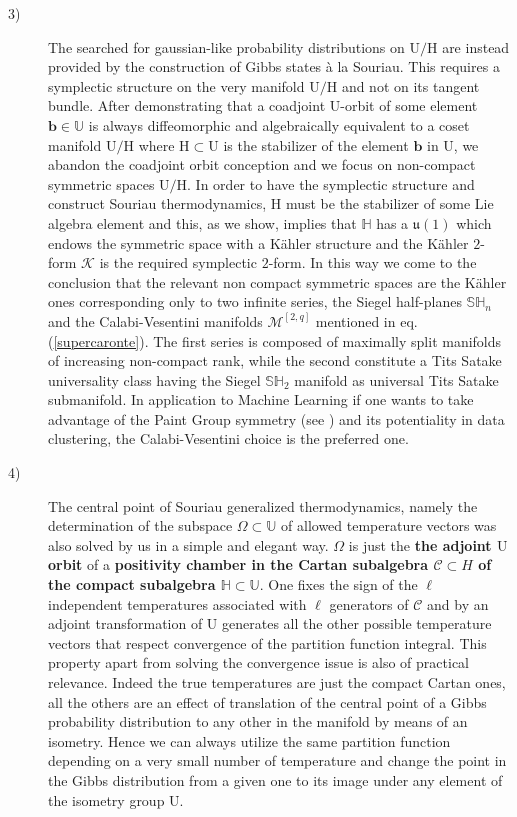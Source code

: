 \documentclass[10pt,a4paper]{article}
\newcommand{\uu}{\mathfrak{u}}
\begin{document}
\begin{description}
  \item[3)] The searched for gaussian-like probability distributions on $\mathrm{U/H}$ are instead provided by the construction of Gibbs states {\`a} la Souriau. This requires a symplectic structure on the very manifold $\mathrm{U/H}$ and not on its tangent bundle. After demonstrating that a coadjoint $\mathrm{U}$-orbit of some element $\mathbf{b} \in \mathbb{U}$ is always diffeomorphic and algebraically equivalent to a coset manifold $\mathrm{U/H}$ where $\mathrm{H}\subset \mathrm{U}$ is the stabilizer of the element $\mathbf{b}$ in $\mathrm{U}$, we abandon the coadjoint orbit conception and we focus on non-compact symmetric spaces
      $\mathrm{U/H}$. In order to have the symplectic structure and construct Souriau thermodynamics, $\mathrm{H}$
      must be the stabilizer of some Lie algebra element and this, as we show, implies that $\mathbb{H}$ has a $\uu(1)$ which endows the symmetric space with a K\"ahler structure and the K\"ahler $2$-form $\boldsymbol{\mathcal{K}}$ is the required symplectic $2$-form. In this way we come to the conclusion that the relevant non compact symmetric spaces are the K\"ahler ones corresponding only to two infinite series, the Siegel half-planes $\mathbb{SH}_n$ and the Calabi-Vesentini manifolds $\mathcal{M}^{[2,q]}$ mentioned in eq.(\ref{supercaronte}). The first series is composed of maximally split manifolds of increasing non-compact rank, while the second constitute a Tits Satake universality class having the Siegel $\mathbb{SH}_2$ manifold as universal Tits Satake submanifold. In application to Machine Learning if one wants to take advantage of the Paint Group symmetry (see \cite{pgtstheory}) and its potentiality in data clustering, the Calabi-Vesentini choice is the preferred one.
  \item[4)] The central point of Souriau generalized thermodynamics, namely the determination of the subspace
   $\Omega \subset \mathbb{U}$ of allowed temperature vectors was also solved by us in a simple and elegant way.
   $\Omega$ is just the \textbf{the adjoint $\mathrm{U}$ orbit} of a \textbf{positivity chamber in the Cartan subalgebra $\mathcal{C}\subset {H}$ of the compact subalgebra $\mathbb{H}\subset \mathbb{U}$}. One fixes the sign of the $\ell$ independent temperatures associated with $\ell$ generators of $\mathcal{C}$ and by an adjoint transformation of $\mathrm{U}$ generates all the other possible temperature vectors that respect convergence of the partition function integral. This property apart from solving the convergence issue is also of practical relevance. Indeed the true temperatures are just the compact Cartan ones, all the others are an effect of translation of the central point of a Gibbs probability distribution to any other in the manifold by means of an isometry. Hence we can always utilize the same partition function depending on a very small number of temperature and change the point in the Gibbs distribution from a given one to its image under any element of the isometry group $\mathrm{U}$.

\end{description}
\end{document}
